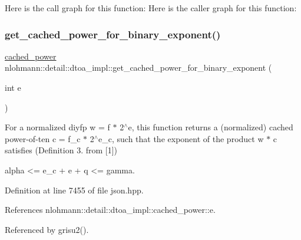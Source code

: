 Here is the call graph for this function\+:
Here is the caller graph for this function\+:
\mbox{\label{namespacenlohmann_1_1detail_1_1dtoa__impl_adbf329a18c5cf854a3477327afd2200b}} 
\subsubsection{\texorpdfstring{get\+\_\+cached\+\_\+power\+\_\+for\+\_\+binary\+\_\+exponent()}{get\_cached\_power\_for\_binary\_exponent()}}
{\footnotesize\ttfamily \hyperlink{structnlohmann_1_1detail_1_1dtoa__impl_1_1cached__power}{cached\+\_\+power} nlohmann\+::detail\+::dtoa\+\_\+impl\+::get\+\_\+cached\+\_\+power\+\_\+for\+\_\+binary\+\_\+exponent (\begin{DoxyParamCaption}\item[{int}]{e }\end{DoxyParamCaption})\hspace{0.3cm}{\ttfamily [inline]}}

For a normalized diyfp w = f $\ast$ 2$^\wedge$e, this function returns a (normalized) cached power-\/of-\/ten c = f\+\_\+c $\ast$ 2$^\wedge$e\+\_\+c, such that the exponent of the product w $\ast$ c satisfies (Definition 3. from \mbox{[}1\mbox{]}) \begin{DoxyVerb} alpha <= e_c + e + q <= gamma.\end{DoxyVerb}
 

Definition at line 7455 of file json.\+hpp.



References nlohmann\+::detail\+::dtoa\+\_\+impl\+::cached\+\_\+power\+::e.



Referenced by grisu2().


